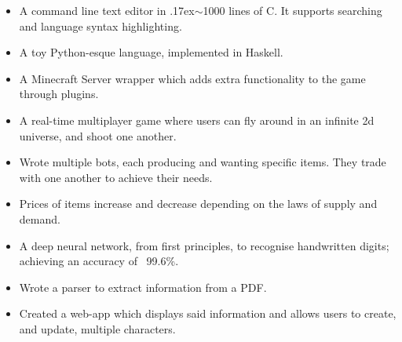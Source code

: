 \documentclass{jcgcv}
\begin{document}
\begin{column}
\begin{itemize}
  \item A command line text editor in {\raise.17ex\hbox{$\scriptstyle\sim$}}1000 lines of C. It supports searching and language syntax highlighting.
\end{itemize}

\begin{itemize}
  \item A toy Python-esque language, implemented in Haskell.
\end{itemize}

\begin{itemize}
  \item A Minecraft Server wrapper which adds extra functionality to the game through plugins.
\end{itemize}

\begin{itemize}
  \item A real-time multiplayer game where users can fly around in an infinite 2d universe, and shoot one another.
\end{itemize}

\begin{itemize}
  \item Wrote multiple bots, each producing and wanting specific items. They trade with one another to achieve their needs.
  \item Prices of items increase and decrease depending on the laws of supply and demand.
\end{itemize}

\begin{itemize}
  \item A deep neural network, from first principles, to recognise handwritten digits; achieving an accuracy of ~99.6\%.
\end{itemize}

\begin{itemize}
  \item Wrote a parser to extract information from a PDF.
  \item Created a web-app which displays said information and allows users to create, and update, multiple characters.
\end{itemize}


\end{column}
\end{document}
